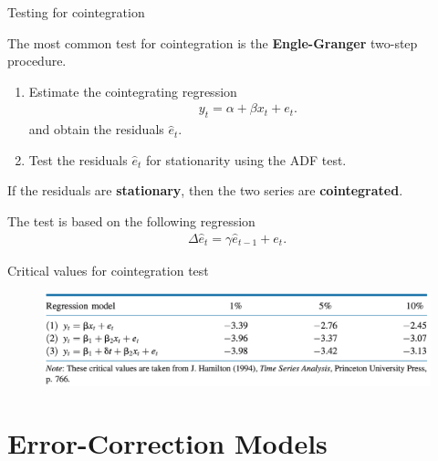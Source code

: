\documentclass[10pt,aspectratio=169]{beamer}  %
\begin{document}
\begin{frame}{Testing for cointegration}

    \bigskip
    The most common test for cointegration is the \textbf{Engle-Granger} two-step procedure.

    \begin{enumerate}\itemsep=1em
        \item Estimate the cointegrating regression
              \begin{align*}
                  y_{t} = \alpha + \beta x_{t} + e_{t}.
              \end{align*}
              and obtain the residuals $ \widehat{e}_{t} $.

        \item Test the residuals $ \widehat{e}_{t} $ for stationarity using the ADF test.
    \end{enumerate}

    \medskip
    If the residuals are \textbf{stationary}, then the two series are \textbf{cointegrated}.

    \medskip
    The test is based on the following regression
    \begin{align*}
        \Delta \widehat{e}_{t} = \gamma \widehat{e}_{t-1} + e_{t}.
    \end{align*}

\end{frame}


\begin{frame}{Critical values for cointegration test}

    \bigskip
    \begin{figure}[H]
        \centering
        \includegraphics[height=0.2\textwidth]{./fig/engel-granger-critical-values.png}
    \end{figure}

\end{frame}


\section{Error-Correction Models}
\end{document}
